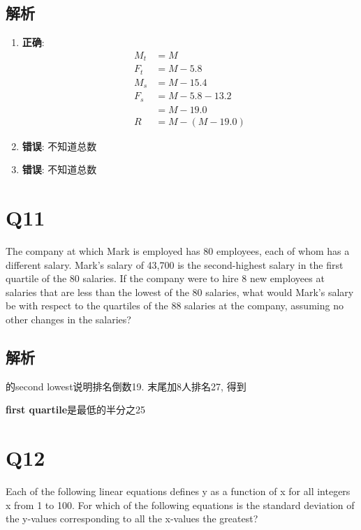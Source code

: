   \subsection{解析}

    \begin{enumerate}
      \item \textbf{正确}:
      \begin{align*}
        M_{t} &= M \\
        F_{t} &= M - 5.8 \\
        M_{s} &= M - 15.4 \\
        F_{s} &= M - 5.8 - 13.2 \\
        &= M - 19.0 \\
        R &= M - \left( M - 19.0 \right)
      \end{align*}
      \item \textbf{错误}: 不知道总数
      \item \textbf{错误}: 不知道总数
    \end{enumerate}

\section{Q11}

  The company at which Mark is employed has 80 employees, each of whom has a
  different salary. Mark’s salary of 43,700 is the second-highest salary
  in the first quartile of the 80 salaries. If the company were to hire
  8 new employees at salaries that are less than the lowest of the 80 salaries,
  what would Mark’s salary be with respect to the quartiles of the 88 salaries
  at the company, assuming no other changes in the salaries?

  \subsection{解析}

    的second lowest说明排名倒数19. 末尾加8人排名27, 得到

    \textbf{first quartile}是最低的半分之25

\section{Q12}

  Each of the following linear equations defines y as a function of x for all
  integers x from 1 to 100. For which of the following equations is the
  standard deviation of the y-values corresponding to all the x-values the
  greatest?

